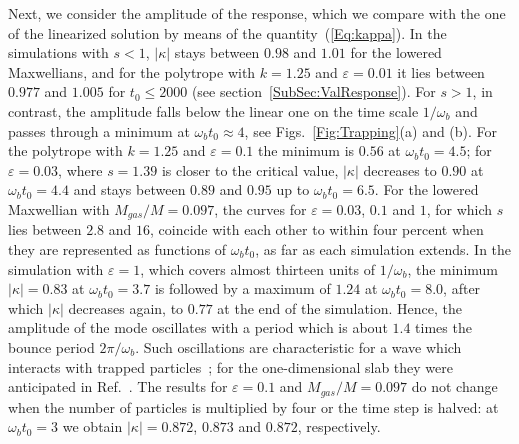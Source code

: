 Next, we consider the amplitude of the response, which we compare with the one of the linearized solution by means of the quantity~(\ref{Eq:kappa}). In the simulations with $s < 1$, $|\kappa|$ stays between $0.98$ and $1.01$ for the lowered Maxwellians, and for the polytrope with $k = 1.25$ and $\varepsilon = 0.01$ it lies between $0.977$ and $1.005$ for $t_0\leq 2000$ (see section~\ref{SubSec:ValResponse}). For $s > 1$, in contrast, the amplitude falls below the linear one on the time scale $1/\omega_b$ and passes through a minimum at $\omega_b t_0\approx 4$, see Figs.~\ref{Fig:Trapping}(a) and (b). For the polytrope with $k = 1.25$ and $\varepsilon = 0.1$ the minimum is $0.56$ at $\omega_b t_0 = 4.5$; for $\varepsilon = 0.03$, where $s = 1.39$ is closer to the critical value, $|\kappa|$ decreases to $0.90$ at $\omega_b t_0 = 4.4$ and stays between $0.89$ and $0.95$ up to $\omega_b t_0 = 6.5$. For the lowered Maxwellian with $M_{gas}/M = 0.097$, the curves for $\varepsilon = 0.03$, $0.1$ and $1$, for which $s$ lies between $2.8$ and $16$, coincide with each other to within four percent when they are represented as functions of $\omega_b t_0$, as far as each simulation extends. In the simulation with $\varepsilon = 1$, which covers almost thirteen units of $1/\omega_b$, the minimum $|\kappa| = 0.83$ at $\omega_b t_0 = 3.7$ is followed by a maximum of $1.24$ at $\omega_b t_0 = 8.0$, after which $|\kappa|$ decreases again, to $0.77$ at the end of the simulation. Hence, the amplitude of the mode oscillates with a period which is about $1.4$ times the bounce period $2\pi/\omega_b$. Such oscillations are characteristic for a wave which interacts with trapped particles~\cite{tO65}; for the one-dimensional slab they were anticipated in Ref.~\cite{pL92}. The results for $\varepsilon = 0.1$ and $M_{gas}/M = 0.097$ do not change when the number of particles is multiplied by four or the time step is halved: at $\omega_b t_0 = 3$ we obtain $|\kappa| = 0.872$, $0.873$ and $0.872$, respectively.

